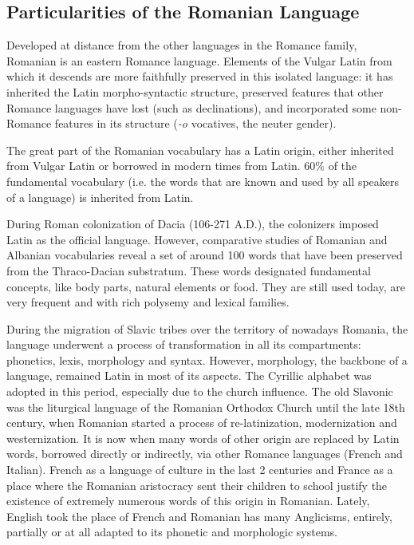 \documentclass[]{../../metanetpaper}
\begin{document}
\begin{multicols}{2}
\subsection{Particularities of the Romanian Language}

Developed at distance from the other languages in the Romance family, Romanian is an eastern Romance language. Elements of the Vulgar Latin from which it descends are more faithfully preserved in this isolated language: it has inherited the Latin morpho-syntactic structure, preserved features that other Romance languages have lost (such as declinations), and incorporated some non-Romance features in its structure (\textit{-o} vocatives, the neuter gender). 

The great part of the Romanian vocabulary has a Latin origin, either inherited from Vulgar Latin or borrowed in modern times from Latin. 60\% of the fundamental vocabulary (i.e. the words that are known and used by all speakers of a language) is inherited from Latin. 

During Roman colonization of Dacia (106-271 A.D.), the colonizers imposed Latin as the official language. However, comparative studies of Romanian and Albanian vocabularies reveal a set of around 100 words that have been preserved from the Thraco-Dacian substratum. These words designated fundamental concepts, like body parts, natural elements or food. They are still used today, are very frequent and with rich polysemy and lexical families.

During the migration of Slavic tribes over the territory of nowadays Romania, the language underwent a process of transformation in all its compartments: phonetics, lexis, morphology and syntax. However, morphology, the backbone of a language, remained Latin in most of its aspects. The Cyrillic alphabet was adopted in this period, especially due to the church influence. The old Slavonic was the liturgical language of the Romanian Orthodox Church until the late 18th century, when Romanian started a process of re-latinization, modernization and westernization. It is now when many words of other origin are replaced by Latin words, borrowed directly or indirectly, via other Romance languages (French and Italian). French as a language of culture in the last 2 centuries and France as a place where the Romanian aristocracy sent their children to school justify the existence of extremely numerous words of this origin in Romanian. Lately, English took the place of French and Romanian has many Anglicisms, entirely, partially or at all adapted to its phonetic and morphologic systems. 


\end{multicols}
\end{document}
